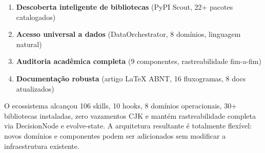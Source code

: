 \documentclass[12pt,a4paper]{article}
\begin{document}
\begin{enumerate}[itemsep=1pt]
  \item \textbf{Descoberta inteligente de bibliotecas} (PyPI Scout, 22+ pacotes catalogados)
  \item \textbf{Acesso universal a dados} (DataOrchestrator, 8 domínios, linguagem natural)
  \item \textbf{Auditoria acadêmica completa} (9 componentes, rastreabilidade fim-a-fim)
  \item \textbf{Documentação robusta} (artigo LaTeX ABNT, 16 fluxogramas, 8 docs atualizados)
\end{enumerate}

O ecossistema alcançou 106 skills, 10 hooks, 8 domínios operacionais, 30+ bibliotecas instaladas, zero vazamentos CJK e mantém rastreabilidade completa via DecisionNode e evolve-state. A arquitetura resultante é totalmente flexível: novos domínios e componentes podem ser adicionados sem modificar a infraestrutura existente.
\end{document}
